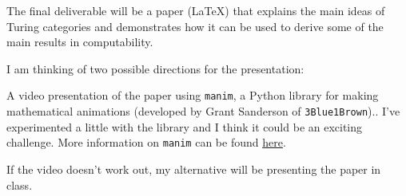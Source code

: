 The final deliverable will be a paper (\LaTeX)
that explains the main ideas of Turing categories and
demonstrates how it can be used to derive some of the main results
in computability.

I am thinking of two possible directions for the presentation:
\begin{enumarabic}
  \item A video presentation of the paper using \verb|manim|,
    a Python library for making mathematical animations
    (developed by Grant Sanderson of \verb|3Blue1Brown|)..
    I've experimented a little with the library and
    I think it could be an exciting challenge.
    More information on \verb|manim| can be found
    \href{https://docs.manim.community/en/stable/tutorials/quickstart.html}{here}.
  \item If the video doesn't work out, my alternative will be presenting
    the paper in class.
\end{enumarabic}

\clearpage
